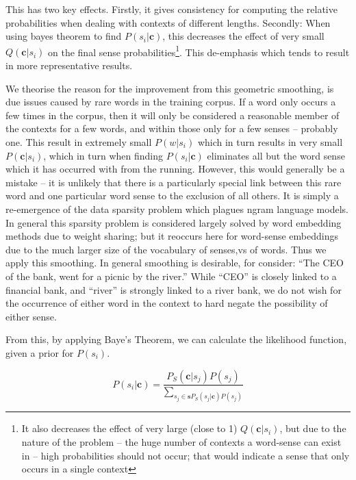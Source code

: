 \documentclass{sig-alternate}
\renewcommand{\c}{\mathbf{c}}
\begin{document}
This has two key effects. Firstly, it gives consistency for computing the relative  probabilities when dealing with contexts of different lengths. Secondly: When using bayes theorem to find $P(s_{i}|\c)$, this decreases the effect of very small $Q(\c|s_{i})$ on the final sense probabilities\footnote{It also decreases the effect of very large (close to 1) $Q(\c|s_{i})$, but due to the nature of the problem -- the huge number of contexts a word-sense can exist in -- high probabilities should not occur; that would indicate a sense that only occurs in a single context}. This de-emphasis which tends to result in more representative results.

We theorise the reason for the improvement from this geometric smoothing, is due issues caused by rare words in the training corpus. If a word only occurs a few times in the corpus, then it will only be considered a reasonable member of the contexts for a few words, and within those only for a few senses -- probably one. This result in extremely small $P(w|s_i)$ which in turn results in very small $P(\c|s_i)$, which in turn when finding $P(s_{i}|\c)$ eliminates all but the word sense which it has occurred with from the running. However, this would generally be a mistake -- it is unlikely that there is a particularly special link between this rare word and one particular word sense to the exclusion of all others. It is simply a re-emergence of the data sparsity problem which plagues ngram language models. In general this sparsity problem is considered largely solved by word embedding methods due to weight sharing; but it reoccurs here for word-sense embeddings due to the much larger size of the vocabulary of senses,vs of words. Thus we apply this smoothing. In general smoothing is desirable, for consider: \enquote{The CEO of the bank, went for a picnic by the river.} While \enquote{CEO} is closely linked to a financial bank, and \enquote{river} is strongly linked to a river bank, we do not wish for the occurrence of either word in the context to hard negate the possibility of either sense.


From this, by applying Baye's Theorem, we can calculate the likelihood function, given a prior for $P(s_i)$.

\begin{equation} \label{eq:generalwsd}
P(s_{i}|\c) = \dfrac{P_S(\c|s_{j})P(s_{j})}{\sum_{s_{j}\in\mathbf{s}P_S(s_{j}|\c)P(s_{j})}}
\end{equation}
\end{document}
